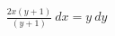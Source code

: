 \documentclass[preview]{standalone}
\begin{document}
\begin{align*}
\frac{2 x \left( y + 1 \right)}{\left( y + 1 \right)} \  dx = y \  dy
\end{align*}
\end{document}
